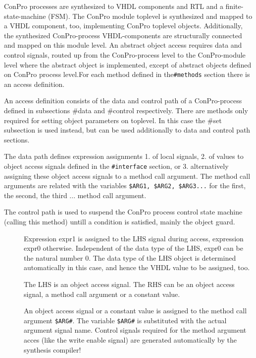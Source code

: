 \documentclass[a4paper,12pt,twoside,english]{article}
\begin{document}
\begin{description}
ConPro processes are synthesized to VHDL components and RTL and a finite-state-machine (FSM). The ConPro module toplevel is synthesized and mapped to a VHDL 
component, too, implementing ConPro toplevel objects. Additionally, the synthesized ConPro-process VHDL-components are structurally connected and mapped on this
module level. An abstract object access requires data and control signals, routed up from the ConPro-process level to the ConPro-module level where the abstract
object is implemented, except of abstract objects defined on ConPro process level.For each method defined in the{\tt  \#methods} section there is an access
definition. 

An access definition consists of the data and control path of a ConPro-process defined in subsections \#data and \#control respectively.  There are methods only
required for setting object parameters on toplevel. In this case the \#set subsection is used instead, but can be used additionally to data and control path
sections.

The data path defines expression assignments 1. of local signals, 2. of values to  object access signals defined in the {\tt \#interface} section, or 3.
alternatively assigning  these object access signals to a method call argument. The method call arguments are related with the variables  {\tt \$ARG1, \$ARG2,
\$ARG3...} for the first, the second, the third ... method call argument. 

The control path is used to suspend the ConPro process control state machine (calling this method) untill a condition is satisfied, mainly the object guard.


\begin{description}
\item[] $ $\\
Expression expr1 is assigned to the LHS signal during access, expression expr0 otherwise. Independent of the data type of the LHS, expr0 can be the natural
number 0.  The data type of the LHS object is determined automatically in this case, and hence the VHDL value to be assigned, too.

The LHS is an object access signal. The RHS can be an object access signal, a method call argument or a constant value.


\item[] $ $\\
An object access signal or a constant value is assigned to the method call argument {\tt \$ARG\#}.  The variable {\tt \$ARG\#} is substituted with the actual
argument signal name. Control signals required for the method argument acces (like the write enable signal)  are generated automatically by the synthesis
compiler!


\end{description}
\end{description}
\end{document}
